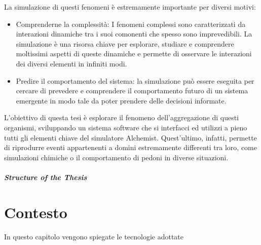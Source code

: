 \documentclass[12pt,a4paper,openright,twoside]{book}
\begin{document}
La simulazione di questi fenomeni è estremamente importante per diversi motivi:
\begin{itemize}
    \item Comprenderne la complessità: I fenomeni complessi sono caratterizzati da interazioni dinamiche tra
    i suoi comonenti che spesso sono imprevedibili. La simulazione è una risorsa chiave per esplorare, studiare e comprendere 
    moltissimi aspetti di queste dinamiche e permette di osservare le interazioni dei diversi elementi in infiniti modi.
    \item Predire il comportamento del sistema: la simulazione può essere eseguita per cercare di prevedere e comprendere il comportamento
    futuro di un sistema emergente in modo tale da poter prendere delle decisioni informate.
\end{itemize}

L'obiettivo di questa tesi è esplorare il fenomeno dell'aggregazione di questi organismi, sviluppando un sistema software che 
si interfacci ed utilizzi a pieno tutti gli elementi chiave del simulatore Alchemist. Quest'ultimo, infatti, permette di riprodurre eventi appartenenti 
a domini estremamente differenti tra loro, come simulazioni chimiche o il comportamento di pedoni in diverse situazioni.


%
%
%

\paragraph{Structure of the Thesis}


\chapter{Contesto}
In questo capitolo vengono spiegate le tecnologie adottate 
\end{document}
